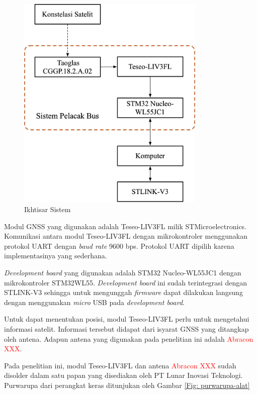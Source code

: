 \begin{figure}[H]
	\centering
	\includegraphics[width=9cm]{contents/chapter-3/system-overview.png}
	\caption{Ikhtisar Sistem}
	\label{Fig: system-overview}
\end{figure}

Modul GNSS yang digunakan adalah Teseo-LIV3FL milik STMicroelectronics. Komunikasi antara modul Teseo-LIV3FL dengan mikrokontroler menggunakan protokol UART dengan \textit{baud rate} 9600 bps. Protokol UART dipilih karena implementasinya yang sederhana. 

\textit{Development board} yang digunakan adalah STM32 Nucleo-WL55JC1 dengan mikrokontroler STM32WL55. \textit{Development board} ini sudah terintegrasi dengan STLINK-V3 sehingga untuk mengunggah \textit{firmware} dapat dilakukan langsung dengan menggunakan \textit{micro} USB pada \textit{development board}.

Untuk dapat menentukan posisi, modul Teseo-LIV3FL perlu untuk mengetahui informasi satelit. Informasi tersebut didapat dari isyarat GNSS yang ditangkap oleh antena. Adapun antena yang digunakan pada penelitian ini adalah \textcolor{red}{Abracon XXX}. 

Pada penelitian ini, modul Teseo-LIV3FL dan antena \textcolor{red}{Abracon XXX} sudah disolder dalam satu papan yang disediakan oleh PT Lunar Inovasi Teknologi. Purwarupa dari perangkat keras ditunjukan oleh Gambar \ref{Fig: purwarupa-alat}

